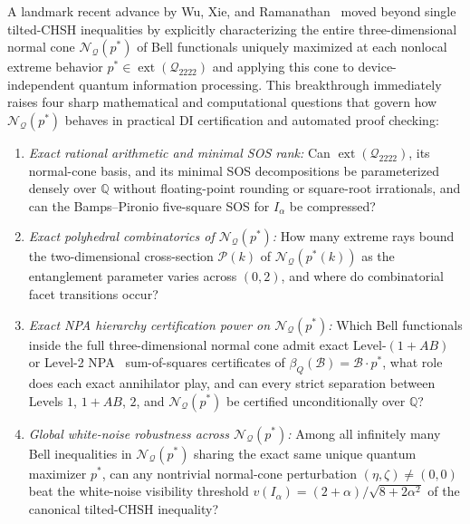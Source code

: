 \documentclass[11pt,a4paper]{article}
\newcommand{\QQ}{\mathbb{Q}}
\newcommand{\calQ}{\mathcal{Q}_{2222}}
\newcommand{\calN}{\mathcal{N}_{\mathcal{Q}}}
\newcommand{\calP}{\mathcal{P}}
\newcommand{\calB}{\mathcal{B}}
\newcommand{\ext}{\operatorname{ext}}
\begin{document}
A landmark recent advance by Wu, Xie, and Ramanathan~\cite{wu2026normalcone} moved beyond single tilted-CHSH inequalities by explicitly characterizing the entire three-dimensional normal cone $\calN(p^*)$ of Bell functionals uniquely maximized at each nonlocal extreme behavior $p^* \in \ext(\calQ)$ and applying this cone to device-independent quantum information processing.
This breakthrough immediately raises four sharp mathematical and computational questions that govern how $\calN(p^*)$ behaves in practical DI certification and automated proof checking:
\begin{enumerate}[leftmargin=1.8em,itemsep=2pt]
  \item \emph{Exact rational arithmetic and minimal SOS rank:} Can $\ext(\calQ)$, its normal-cone basis, and its minimal SOS decompositions be parameterized densely over $\QQ$ without floating-point rounding or square-root irrationals, and can the Bamps--Pironio five-square SOS for $I_\alpha$ be compressed?
  \item \emph{Exact polyhedral combinatorics of $\calN(p^*)$:} How many extreme rays bound the two-dimensional cross-section $\calP(k)$ of $\calN(p^*(k))$ as the entanglement parameter varies across $(0,2)$, and where do combinatorial facet transitions occur?
  \item \emph{Exact NPA hierarchy certification power on $\calN(p^*)$:} Which Bell functionals inside the full three-dimensional normal cone admit exact Level-$(1+AB)$ or Level-2 NPA~\cite{npa2007bounding,npa2008convergent} sum-of-squares certificates of $\beta_Q(\calB) = \calB \cdot p^*$, what role does each exact annihilator play, and can every strict separation between Levels $1$, $1+AB$, $2$, and $\calN(p^*)$ be certified unconditionally over $\QQ$?
  \item \emph{Global white-noise robustness across $\calN(p^*)$:} Among all infinitely many Bell inequalities in $\calN(p^*)$ sharing the exact same unique quantum maximizer $p^*$, can any nontrivial normal-cone perturbation $(\eta,\zeta) \neq (0,0)$ beat the white-noise visibility threshold $v(I_\alpha) = (2+\alpha)/\sqrt{8+2\alpha^2}$ of the canonical tilted-CHSH inequality?
\end{enumerate}
\end{document}
